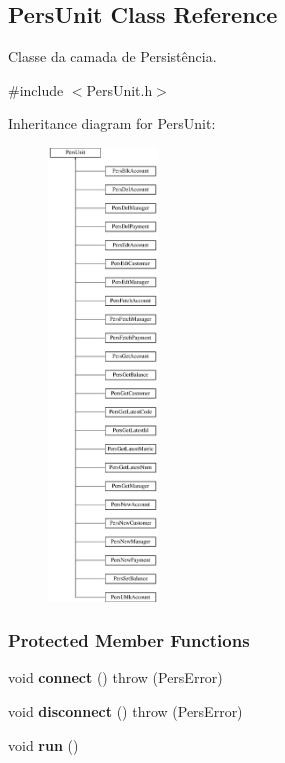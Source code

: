 \hypertarget{classPersUnit}{\subsection{Pers\-Unit Class Reference}
\label{dc/d66/classPersUnit}
}


Classe da camada de Persistência.  




{\ttfamily \#include $<$Pers\-Unit.\-h$>$}

Inheritance diagram for Pers\-Unit\-:\begin{figure}[H]
\begin{center}
\leavevmode
\includegraphics[height=12.000000cm]{dc/d66/classPersUnit}
\end{center}
\end{figure}
\subsubsection*{Protected Member Functions}
\begin{DoxyCompactItemize}
\item 
\hypertarget{classPersUnit_a967b9dfe6dfd743afe9266c5f7b55b21}{void {\bfseries connect} ()  throw (\-Pers\-Error)}\label{dc/d66/classPersUnit_a967b9dfe6dfd743afe9266c5f7b55b21}

\item 
\hypertarget{classPersUnit_a579cc5bb9322437500d619c98f837b38}{void {\bfseries disconnect} ()  throw (\-Pers\-Error)}\label{dc/d66/classPersUnit_a579cc5bb9322437500d619c98f837b38}

\item 
\hypertarget{classPersUnit_a2d09b230772996d360b1d0f8488ebc07}{void {\bfseries run} ()}\label{dc/d66/classPersUnit_a2d09b230772996d360b1d0f8488ebc07}

\end{DoxyCompactItemize}
